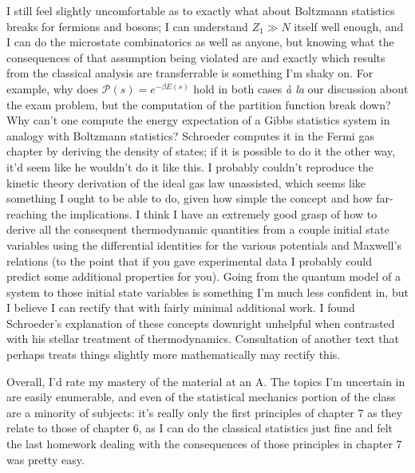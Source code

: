 \documentclass[12pt]{article}
\begin{document}
I still feel slightly uncomfortable as to exactly what about Boltzmann statistics breaks for fermions and bosons; I can understand $Z_{1}\gg N$ itself well enough, and I can do the microstate combinatorics as well as anyone, but knowing what the consequences of that assumption
being violated are and exactly which results from the classical analysis are transferrable is something I'm shaky on.
For example, why does $\mathcal{P}(s)=e^{-\beta E(s)}$ hold in both cases \textit{\`a la} our discussion about the exam problem, but the
computation of the partition function break down?
Why can't one compute the energy expectation of a Gibbs statistics system in analogy with Boltzmann statistics?
Schroeder computes it in the Fermi gas chapter by deriving the density of states; if it is possible to do it the other way, it'd seem like
he wouldn't do it like this.
I probably couldn't reproduce the kinetic theory derivation of the ideal gas law unassisted, which seems like something I ought to be able
to do, given how simple the concept and how far-reaching the implications.
I think I have an extremely good grasp of how to derive all the consequent thermodynamic quantities from a couple initial state variables
using the differential identities for the various potentials and Maxwell's relations (to the point that if you gave experimental data I
probably could predict some additional properties for you).
Going from the quantum model of a system to those initial state variables is something I'm much less confident in, but I believe I can
rectify that with fairly minimal additional work.
I found Schroeder's explanation of these concepts downright unhelpful when contrasted with his stellar treatment of thermodynamics.
Consultation of another text that perhaps treats things slightly more mathematically may rectify this.

Overall, I'd rate my mastery of the material at an A.
The topics I'm uncertain in are easily enumerable, and even of the statistical mechanics portion of the class are a minority of subjects:
it's really only the first principles of chapter 7 as they relate to those of chapter 6, as I can do the classical statistics just fine and
felt the last homework dealing with the consequences of those principles in chapter 7 was pretty easy.
\end{document}
